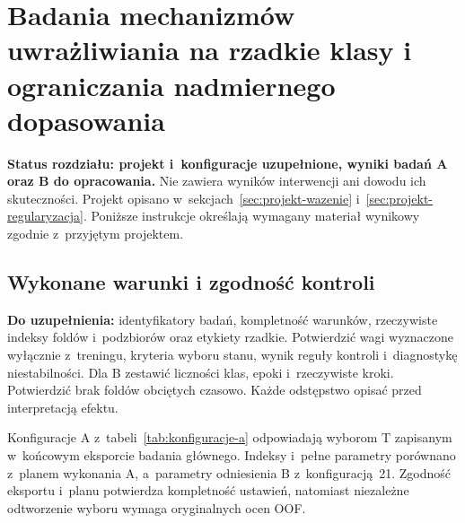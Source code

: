 \clearpage
\section{Badania mechanizmów uwrażliwiania na rzadkie klasy i ograniczania nadmiernego dopasowania}
\label{chap:mechanizmy}

\textbf{Status rozdziału: projekt i~konfiguracje uzupełnione, wyniki badań A oraz B do opracowania.} Nie zawiera wyników interwencji ani dowodu ich skuteczności. Projekt opisano w~sekcjach~\ref{sec:projekt-wazenie} i~\ref{sec:projekt-regularyzacja}. Poniższe instrukcje określają wymagany materiał wynikowy zgodnie z~przyjętym projektem.

\subsection{Wykonane warunki i zgodność kontroli}
\label{sec:mechanizmy-kontrole}

\textbf{Do uzupełnienia:} identyfikatory badań, kompletność warunków, rzeczywiste indeksy foldów i~podzbiorów oraz etykiety rzadkie. Potwierdzić wagi wyznaczone wyłącznie z~treningu, kryteria wyboru stanu, wynik reguły kontroli i~diagnostykę niestabilności. Dla B zestawić liczności klas, epoki i~rzeczywiste kroki. Potwierdzić brak foldów obciętych czasowo. Każde odstępstwo opisać przed interpretacją efektu.

Konfiguracje A z~tabeli~\ref{tab:konfiguracje-a} odpowiadają wyborom T zapisanym w~końcowym eksporcie badania głównego. Indeksy i~pełne parametry porównano z~planem wykonania A, a~parametry odniesienia B z~konfiguracją~21. Zgodność eksportu i~planu potwierdza kompletność ustawień, natomiast niezależne odtworzenie wyboru wymaga oryginalnych ocen OOF.

